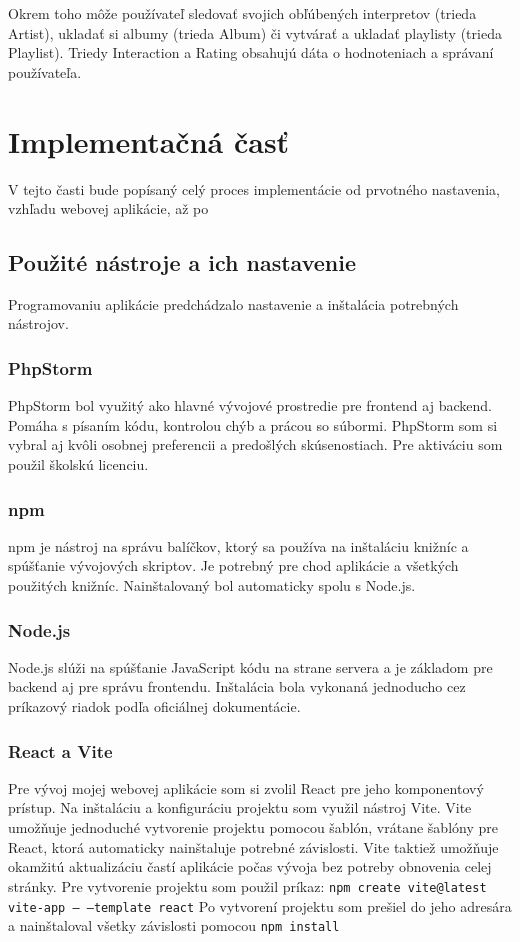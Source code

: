 Okrem toho môže používateľ sledovať svojich obľúbených interpretov (trieda Artist), ukladať si albumy (trieda Album) či vytvárať a ukladať playlisty (trieda Playlist). Triedy Interaction a Rating obsahujú dáta o hodnoteniach a správaní používateľa.


\section{Implementačná časť}\label{sec:ImplementacnaCast}
V tejto časti bude popísaný celý proces implementácie od prvotného nastavenia, vzhľadu webovej aplikácie, až po  

\subsection{Použité nástroje a ich nastavenie}
Programovaniu aplikácie predchádzalo nastavenie a inštalácia potrebných nástrojov.

\subsubsection{PhpStorm}
PhpStorm bol využitý ako hlavné vývojové prostredie pre frontend aj backend. Pomáha s písaním kódu, kontrolou chýb a prácou so súbormi. PhpStorm som si vybral aj kvôli osobnej preferencii a predošlých skúsenostiach. Pre aktiváciu som použil školskú licenciu.

\subsubsection{npm}
npm je nástroj na správu balíčkov, ktorý sa používa na inštaláciu knižníc a spúšťanie vývojových skriptov. Je potrebný pre chod aplikácie a všetkých použitých knižníc. Nainštalovaný bol automaticky spolu s Node.js.

\subsubsection{Node.js}
Node.js slúži na spúšťanie JavaScript kódu na strane servera a je základom pre backend aj pre správu frontendu. Inštalácia bola vykonaná jednoducho cez príkazový riadok podľa oficiálnej dokumentácie.

\subsubsection{React a Vite}
Pre vývoj mojej webovej aplikácie som si zvolil React pre jeho komponentový prístup. Na inštaláciu a konfiguráciu projektu som využil nástroj Vite. Vite umožňuje jednoduché vytvorenie projektu pomocou šablón, vrátane šablóny pre React, ktorá automaticky nainštaluje potrebné závislosti. Vite taktiež umožňuje okamžitú aktualizáciu častí aplikácie počas vývoja bez potreby obnovenia celej stránky. 
Pre vytvorenie projektu som použil príkaz: \texttt{npm create vite@latest vite-app -- --template react}
Po vytvorení projektu som prešiel do jeho adresára a nainštaloval všetky závislosti pomocou \texttt{npm install}

